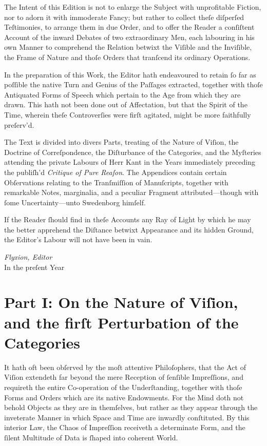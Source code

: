 \documentclass[12pt]{article}
\begin{document}
The Intent of this Edition is not to enlarge the Subject with unprofitable 
Fiction, nor to adorn it with immoderate Fancy; but rather to collect theſe 
diſperſed Teſtimonies, to arrange them in due Order, and to offer the Reader a 
conſiſtent Account of the inward Debates of two extraordinary Men, each 
labouring in his own Manner to comprehend the Relation betwixt the Viſible and 
the Inviſible, the Frame of Nature and thoſe Orders that tranſcend its ordinary 
Operations.

In the preparation of this Work, the Editor hath endeavoured to retain ſo far 
as poſſible the native Turn and Genius of the Paſſages extracted, together with 
thoſe Antiquated Forms of Speech which pertain to the Age from which they are 
drawn. This hath not been done out of Affectation, but that the Spirit of the 
Time, wherein theſe Controverſies were firſt agitated, might be more faithfully 
preſerv’d.

The Text is divided into divers Parts, treating of the Nature of Viſion, the 
Doctrine of Correſpondence, the Diſturbance of the Categories, and the 
Myſteries attending the private Labours of Herr Kant in the Years immediately 
preceding the publiſh’d \textit{Critique of Pure Reaſon}. The Appendices contain 
certain Obſervations relating to the Tranſmiſſion of Manuſcripts, together with 
remarkable Notes, marginalia, and a peculiar Fragment attributed—though with 
ſome Uncertainty—unto Swedenborg himſelf.

If the Reader ſhould find in theſe Accounts any Ray of Light by which he may 
the better apprehend the Diſtance betwixt Appearance and its hidden Ground, the 
Editor’s Labour will not have been in vain.

\begin{flushright}
\textit{Flyxion, Editor}\\
In the preſent Year
\end{flushright}

\newpage

\tableofcontents


\newpage

\section*{Part I: On the Nature of Viſion, and the firſt Perturbation of the Categories}

It hath oft been obſerved by the moſt attentive Philoſophers, that the Act of 
Viſion extendeth far beyond the mere Reception of ſenſible Impreſſions, and 
requireth the entire Co-operation of the Underſtanding, together with thoſe 
Forms and Orders which are its native Endowments. For the Mind doth not behold 
Objects as they are in themſelves, but rather as they appear through the 
inveterate Manner in which Space and Time are inwardly conſtituted. By this 
interior Law, the Chaos of Impreſſion receiveth a determinate Form, and the 
ſilent Multitude of Data is ſhaped into coherent World.
\end{document}
